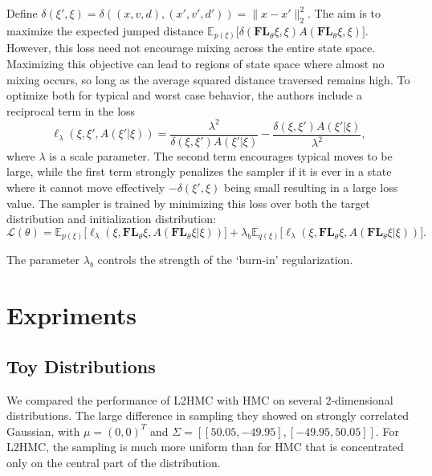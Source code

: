 \documentclass{article}
\begin{document}
Define $\delta(\xi', \xi) = \delta((x, v, d), (x', v', d')) = \| x - x' \|_2^2$. The aim is to maximize the expected jumped distance $\mathbb{E}_{p(\xi)} \big[ \delta (\mathbf{FL}_{\theta}\xi, \xi) A(\mathbf{FL}_{\theta}\xi, \xi) \big]$. However, this loss need not encourage mixing across the entire state space. Maximizing this objective can lead to regions of state space where almost no mixing occurs, so long as the average squared distance traversed remains high. To optimize both for typical and worst case behavior, the authors include a reciprocal term in the loss
\[
    \ell_{\lambda}(\xi, \xi', A(\xi' | \xi)) = \frac{\lambda^2}{\delta(\xi, \xi')A(\xi' | \xi)} - \frac{\delta(\xi, \xi')A(\xi' | \xi)}{\lambda^2},
\]
where $\lambda$ is a scale parameter. The second term encourages typical moves to be large, while the first term strongly penalizes the sampler if it is ever in a state where it cannot move effectively $-\delta(\xi', \xi)$ being small resulting in a large loss value. The sampler is trained by minimizing this loss over both the target distribution and initialization distribution:
\[
    \mathcal{L}(\theta) = \mathbb{E}_{p(\xi)} \big[ \ell_{\lambda}(\xi, \mathbf{FL}_{\theta}\xi, A(\mathbf{FL}_{\theta}\xi | \xi)) \big] + \lambda_b \mathbb{E}_{q(\xi)} \big[ \ell_{\lambda}(\xi, \mathbf{FL}_{\theta}\xi, A(\mathbf{FL}_{\theta}\xi | \xi)) \big].
\]

The parameter $\lambda_b$ controls the strength of the ‘burn-in’ regularization.














\section*{Expriments}

\subsection*{Toy Distributions}

We compared the performance of L2HMC with HMC on several 2-dimensional distributions. The large difference in sampling they showed on strongly correlated Gaussian, with $\mu = (0, 0)^T$ and $\Sigma = [[50.05, -49.95], [-49.95, 50.05]]$. For L2HMC, the sampling is much more uniform than for HMC that is concentrated only on the central part of the distribution.
\end{document}

